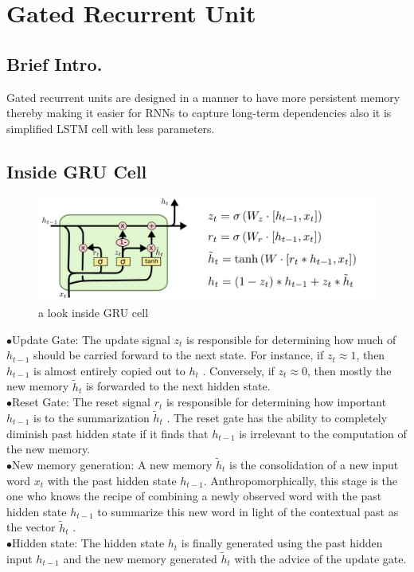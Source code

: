 \section{Gated Recurrent Unit}
\label{chap:Gated Recurrent Unit}

\subsection{Brief Intro.}
Gated recurrent units are designed in a
manner to have more persistent memory thereby making it easier for
RNNs to capture long-term dependencies also it is simplified  LSTM cell with less parameters.
\subsection{Inside GRU Cell}
\begin{figure}[H]%
    \center%
    \includegraphics[width=\textwidth]{images/amir/LSTM3-var-GRU.png}%
    \caption[This is gru-inside image]{a look inside GRU cell}\label{fig:gru inside}%
  \end{figure}
\indent$\bullet$Update Gate: The update signal $z_t$
is responsible for determining
how much of $h_{t-1}$ should be carried forward to the next state. For
instance, if $z_{t} \approx 1$, then  $h_{t-1}$ is almost entirely copied out to $h_t$
.
Conversely, if $z_{t} \approx 0$, then mostly the new memory $\tilde{h}_{t}$ 
is forwarded
to the next hidden state.\\
\indent$\bullet$Reset Gate: The reset signal $r_t$
is responsible for determining how
important $h_{t-1}$ is to the summarization $\tilde{h}_{t}$
. The reset gate has the
ability to completely diminish past hidden state if it finds that $h_{t-1}$
is irrelevant to the computation of the new memory.\\
\indent$\bullet$New memory generation: A new memory $\tilde{h}_{t}$
is the consolidation of
a new input word $x_t$ with the past hidden state $h_{t-1}$. Anthropomorphically,
this stage is the one who knows the recipe of combining a
newly observed word with the past hidden state $h_{t-1}$ to summarize
this new word in light of the contextual past as the vector $\tilde{h}_{t}$ .\\
\indent$\bullet$Hidden state: The hidden state $h_t$
is finally generated using the
past hidden input $h_{t-1}$ and the new memory generated $\tilde{h}_{t}$ with the
advice of the update gate.\\
